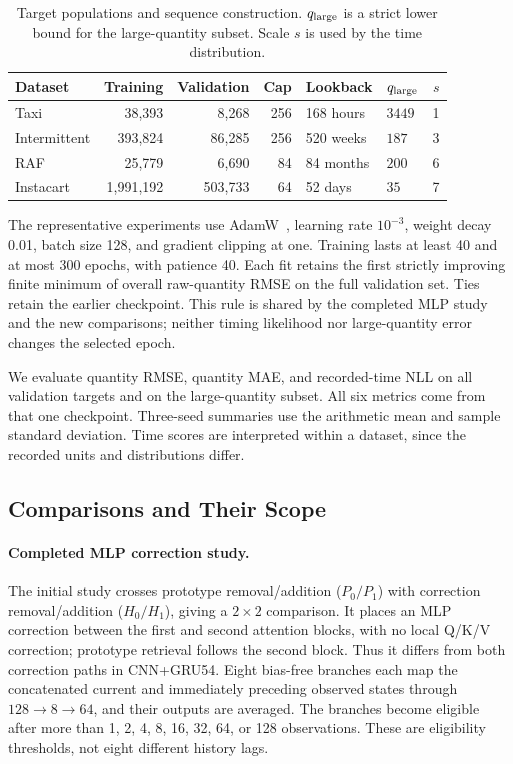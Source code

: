 \documentclass[runningheads]{llncs}
\begin{document}
\begin{table}[t]
\caption{Target populations and sequence construction. $q_{\rm large}$ is a strict lower bound for the large-quantity subset. Scale $s$ is used by the time distribution.}
\label{tab:data}
\centering\small
\setlength{\tabcolsep}{4pt}
\begin{tabular}{@{}lrrrllr@{}}
\toprule
Dataset & Training & Validation & Cap & Lookback & $q_{\rm large}$ & $s$\\
\midrule
Taxi & 38,393 & 8,268 & 256 & 168 hours & $3449$ & 1\\
Intermittent & 393,824 & 86,285 & 256 & 520 weeks & $187$ & 3\\
RAF & 25,779 & 6,690 & 84 & 84 months & $200$ & 6\\
Instacart & 1,991,192 & 503,733 & 64 & 52 days & $35$ & 7\\
\bottomrule
\end{tabular}
\end{table}

The representative experiments use AdamW~\cite{loshchilov2019adamw}, learning rate $10^{-3}$, weight decay 0.01, batch size 128, and gradient clipping at one. Training lasts at least 40 and at most 300 epochs, with patience 40. Each fit retains the first strictly improving finite minimum of overall raw-quantity RMSE on the full validation set. Ties retain the earlier checkpoint. This rule is shared by the completed MLP study and the new comparisons; neither timing likelihood nor large-quantity error changes the selected epoch.

We evaluate quantity RMSE, quantity MAE, and recorded-time NLL on all validation targets and on the large-quantity subset. All six metrics come from that one checkpoint. Three-seed summaries use the arithmetic mean and sample standard deviation. Time scores are interpreted within a dataset, since the recorded units and distributions differ.

\subsection{Comparisons and Their Scope}
\paragraph{Completed MLP correction study.}
The initial study crosses prototype removal/addition ($P_0/P_1$) with correction removal/addition ($H_0/H_1$), giving a $2\times2$ comparison. It places an MLP correction between the first and second attention blocks, with no local Q/K/V correction; prototype retrieval follows the second block. Thus it differs from both correction paths in CNN+GRU54. Eight bias-free branches each map the concatenated current and immediately preceding observed states through $128\!\to\!8\!\to\!64$, and their outputs are averaged. The branches become eligible after more than 1, 2, 4, 8, 16, 32, 64, or 128 observations. These are eligibility thresholds, not eight different history lags.
\end{document}
